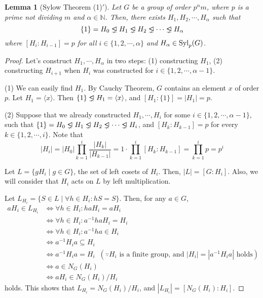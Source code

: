 \documentclass{article}
\newtheorem{lemma}{Lemma}
\newcommand{\triangleleftneq}{\mathrel{\ooalign{$\lneq$\cr\raise.22ex\hbox{$\lhd$}\cr}}}
\newcommand{\bbN}{\mathbb{N}}
\newcommand{\Syl}{\textnormal{Syl}}
\begin{document}
\begin{lemma}[Sylow Theorem (1)\('\)]\label{lem-syl-1}
  Let \(G\) be a group of order \(p^\alpha m\), where \(p\) is a prime not dividing \(m\) and \(\alpha \in \bbN\). Then, there exists \(H_1, H_2, \cdots, H_\alpha\) such that
  \[\{1\} = H_0 \triangleleftneq H_1 \triangleleftneq H_2 \triangleleftneq \cdots \triangleleftneq H_\alpha\]
  where \([H_i : H_{i - 1}] = p\) for all \(i \in \{1, 2, \cdots, \alpha\}\) and \(H_\alpha \in \Syl_p(G)\).
\end{lemma}
\begin{proof}
  Let's construct \(H_1, \cdots, H_\alpha\) in two steps:
  (1) constructing \(H_1\),
  (2) constructing \(H_{i + 1}\) when \(H_i\) was constructed for \(i \in \{1, 2, \cdots, \alpha - 1\}\).

  (1) We can easily find \(H_1\). By Cauchy Theorem, \(G\) contains an element \(x\) of order \(p\). Let \(H_1 = \langle x \rangle\). Then \(\{1\} \triangleleftneq H_1 = \langle x \rangle\), and \([H_1: \{1\}] = |H_1| = p\).

  (2) Suppose that we already constructed \(H_1, \cdots, H_i\) for some \(i \in \{1, 2, \cdots, \alpha - 1\}\), such that
  \(\{1\} = H_0 \triangleleftneq H_1 \triangleleftneq H_2 \triangleleftneq \cdots \triangleleftneq H_i\), and \([H_{k} : H_{k - 1}] = p\) for every \(k \in \{1, 2, \cdots, i\}\).
  Note that
  \[|H_i| = |H_0|\prod_{k = 1}^{i} \frac{|H_k|}{|H_{k - 1}|}
  = 1 \cdot \prod_{k = 1}^{i} [H_k : H_{k - 1}] = \prod_{k = 1}^{i} p = p^i\]

  Let \(L = \{gH_i \mid g \in G\}\), the set of left cosets of \(H_i\).
  Then, \(|L| = [G : H_i]\).
  Also, we will consider that \(H_i\) acts on \(L\) by left multiplication.

  Let \(L_{H_i} = \{S \in L \mid \forall h \in H_i : hS = S\}\).
  Then, for any \(a \in G\),
  \begin{align*}
    aH_i \in L_{H_i}
    &\Leftrightarrow \forall h \in H_i: haH_i = aH_i
    \\&\Leftrightarrow \forall h \in H_i: a^{-1}haH_i = H_i
    \\&\Leftrightarrow \forall h \in H_i: a^{-1}ha \in H_i
    \\&\Leftrightarrow a^{-1}H_ia \subseteq H_i
    \\&\Leftrightarrow a^{-1}H_ia = H_i
    \;\;(\because H_i\text{ is a finite group, and } |H_i| = |a^{-1}H_ia| \text{ holds})
    \\&\Leftrightarrow a \in N_G(H_i)
    \\&\Leftrightarrow aH_i \in N_G(H_i) / H_i
  \end{align*}
  holds.
  This shows that \(L_{H_i} = N_G(H_i) / H_i\), and \(|L_{H_i}| = [N_G(H_i) : H_i]\).


\end{proof}
\end{document}
